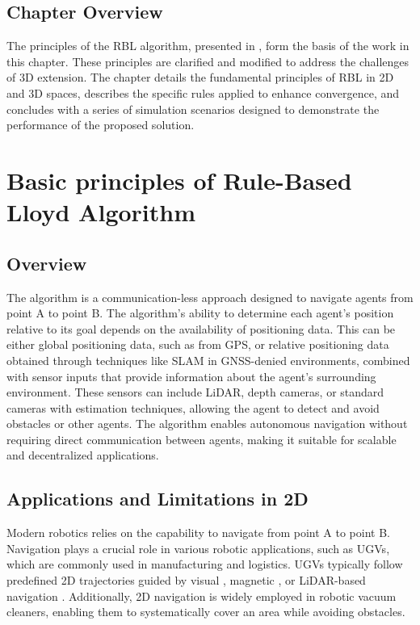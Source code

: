     \subsection{Chapter Overview}
        The principles of the \ac{RBL} algorithm, presented in \cite{rbl_paper}, form the basis of the work in this chapter. 
        These principles are clarified and modified to address the challenges of 3D extension.  
        The chapter details the fundamental principles of RBL in 2D and 3D spaces, describes the specific rules applied to enhance convergence, and concludes with a series of simulation scenarios designed to demonstrate the performance of the proposed solution.

\section{Basic principles of Rule-Based Lloyd Algorithm}

    \subsection{Overview}        
        The algorithm is a communication-less approach designed to navigate agents from point A to point B. 
        The algorithm's ability to determine each agent's position relative to its goal depends on the availability of positioning data. 
        This can be either global positioning data, such as from GPS, or relative positioning data obtained through techniques like SLAM in GNSS-denied environments, combined with sensor inputs that provide information about the agent's surrounding environment.
        These sensors can include LiDAR, depth cameras, or standard cameras with estimation techniques, allowing the agent to detect and avoid obstacles or other agents. 
        The algorithm enables autonomous navigation without requiring direct communication between agents, making it suitable for scalable and decentralized applications.

    \subsection{Applications and Limitations in 2D}
        Modern robotics relies on the capability to navigate from point A to point B.
        Navigation plays a crucial role in various robotic applications, such as \ac{UGV}s, which are commonly used in manufacturing and logistics. 
        \ac{UGV}s typically follow predefined 2D trajectories guided by visual \cite{vision_navigation}, magnetic \cite{magnetic_navigation}, or LiDAR-based navigation \cite{lidar_navigation}. 
        Additionally, 2D navigation is widely employed in robotic vacuum cleaners, enabling them to systematically cover an area while avoiding obstacles.

